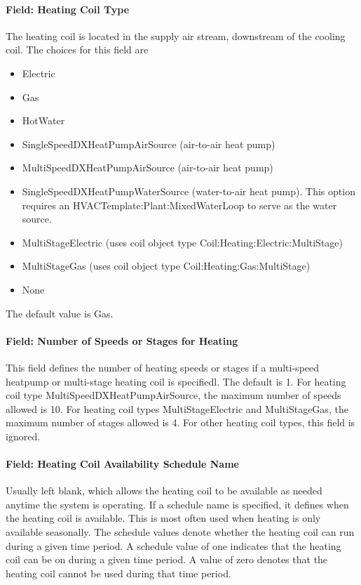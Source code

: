 \paragraph{Field: Heating Coil Type}\label{field-heating-coil-type-3}

The heating coil is located in the supply air stream, downstream of the cooling coil. The choices for this field are

\begin{itemize}
\item
  Electric
\item
  Gas
\item
  HotWater
\item
  SingleSpeedDXHeatPumpAirSource (air-to-air heat pump)
\item
  MultiSpeedDXHeatPumpAirSource (air-to-air heat pump)
\item
  SingleSpeedDXHeatPumpWaterSource (water-to-air heat pump). This option requires an HVACTemplate:Plant:MixedWaterLoop to serve as the water source.
\item
  MultiStageElectric (uses coil object type Coil:Heating:Electric:MultiStage)
\item
  MultiStageGas (uses coil object type Coil:Heating:Gas:MultiStage)
\item
  None
\end{itemize}

The default value is Gas.

\paragraph{Field: Number of Speeds or Stages for Heating}\label{field-number-of-speeds-or-stages-for-heating}

This field defines the number of heating speeds or stages if a multi-speed heatpump or multi-stage heating coil is specifiedl. The default is 1. For heating coil type MultiSpeedDXHeatPumpAirSource, the maximum number of speeds allowed is 10. For heating coil types MultiStageElectric and MultiStageGas, the maximum number of stages allowed is 4. For other heating coil types, this field is ignored.

\paragraph{Field: Heating Coil Availability Schedule Name}\label{field-heating-coil-availability-schedule-name-3}

Usually left blank, which allows the heating coil to be available as needed anytime the system is operating. If a schedule name is specified, it defines when the heating coil is available. This is most often used when heating is only available seasonally. The schedule values denote whether the heating coil can run during a given time period. A schedule value of one indicates that the heating coil can be on during a given time period. A value of zero denotes that the heating coil cannot be used during that time period.

